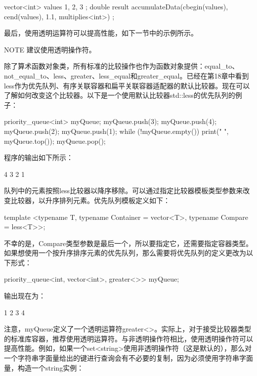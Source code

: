 \begin{cpp}
vector<int> values { 1, 2, 3 };
double result {
    accumulateData(cbegin(values), cend(values), 1.1, multiplies<int>{}) };
\end{cpp}

最后，使用透明运算符可以提高性能，如下一节中的示例所示。

\begin{myNotic}{NOTE}
建议使用透明操作符。
\end{myNotic}


除了算术函数对象类，所有标准的比较操作也作为函数对象提供：equal\_to、not\_equal\_to、less、greater、less\_equal和greater\_equal。已经在第18章中看到less作为优先队列、有序关联容器和扁平关联容器适配器的默认比较器。现在可以了解如何改变这个比较器。以下是一个使用默认比较器std::less的优先队列的例子：

\begin{cpp}
priority_queue<int> myQueue;
myQueue.push(3);
myQueue.push(4);
myQueue.push(2);
myQueue.push(1);
while (!myQueue.empty()) {
    print("{} ", myQueue.top());
    myQueue.pop();
}
\end{cpp}

程序的输出如下所示：

\begin{shell}
4 3 2 1
\end{shell}

队列中的元素按照less比较器以降序移除。可以通过指定比较器模板类型参数来改变比较器，以升序排列元素。优先队列模板定义如下：

\begin{cpp}
template <typename T, typename Container = vector<T>, typename Compare = less<T>>;
\end{cpp}

不幸的是，Compare类型参数是最后一个，所以要指定它，还需要指定容器类型。如果想使用一个按升序排序元素的优先队列，那么需要将优先队列的定义更改为以下形式：

\begin{cpp}
priority_queue<int, vector<int>, greater<>> myQueue;
\end{cpp}

输出现在为：

\begin{shell}
1 2 3 4
\end{shell}

注意，myQueue定义了一个透明运算符greater<>。实际上，对于接受比较器类型的标准库容器，推荐使用透明运算符。与非透明操作符相比，使用透明操作符可以提高性能。例如，如果一个set<string>使用非透明操作符（这是默认的），那么对一个字符串字面量给出的键进行查询会有不必要的复制，因为必须使用字符串字面量，构造一个string实例：

